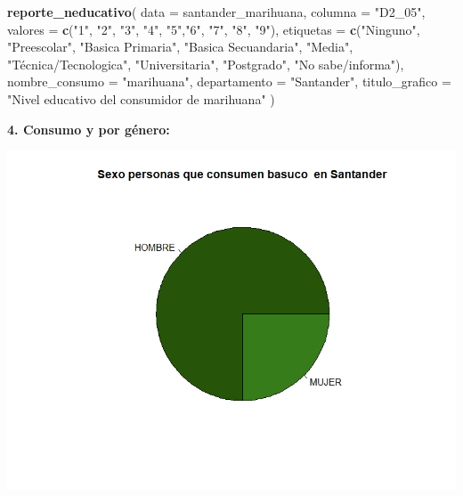 \documentclass[
]{article}
\newenvironment{Shaded}{\begin{snugshade}}{\end{snugshade}}
\newcommand{\AttributeTok}[1]{\textcolor[rgb]{0.13,0.29,0.53}{#1}}
\newcommand{\FunctionTok}[1]{\textcolor[rgb]{0.13,0.29,0.53}{\textbf{#1}}}
\newcommand{\NormalTok}[1]{#1}
\newcommand{\StringTok}[1]{\textcolor[rgb]{0.31,0.60,0.02}{#1}}
\begin{document}
\begin{Shaded}
\begin{Highlighting}[]
\FunctionTok{reporte\_neducativo}\NormalTok{(}
  \AttributeTok{data =}\NormalTok{ santander\_marihuana,}
  \AttributeTok{columna =} \StringTok{"D2\_05"}\NormalTok{,}
  \AttributeTok{valores =} \FunctionTok{c}\NormalTok{(}\StringTok{"1"}\NormalTok{, }\StringTok{"2"}\NormalTok{, }\StringTok{"3"}\NormalTok{, }\StringTok{"4"}\NormalTok{, }\StringTok{"5"}\NormalTok{,}\StringTok{"6"}\NormalTok{, }\StringTok{"7"}\NormalTok{, }\StringTok{"8"}\NormalTok{, }\StringTok{"9"}\NormalTok{),}
  \AttributeTok{etiquetas =} \FunctionTok{c}\NormalTok{(}\StringTok{"Ninguno"}\NormalTok{, }\StringTok{"Preescolar"}\NormalTok{, }\StringTok{"Basica Primaria"}\NormalTok{, }\StringTok{"Basica Secuandaria"}\NormalTok{, }\StringTok{"Media"}\NormalTok{, }\StringTok{"Técnica/Tecnologica"}\NormalTok{, }\StringTok{"Universitaria"}\NormalTok{, }\StringTok{"Postgrado"}\NormalTok{, }\StringTok{"No sabe/informa"}\NormalTok{),}
  \AttributeTok{nombre\_consumo =} \StringTok{"marihuana"}\NormalTok{,}
  \AttributeTok{departamento =} \StringTok{"Santander"}\NormalTok{,}
  \AttributeTok{titulo\_grafico =} \StringTok{"Nivel educativo del consumidor de marihuana"}
\NormalTok{)}
\end{Highlighting}
\end{Shaded}

\hfill\break

\textbf{4. Consumo y por género:}

\includegraphics{images/basuco S santander.png}
\end{document}
